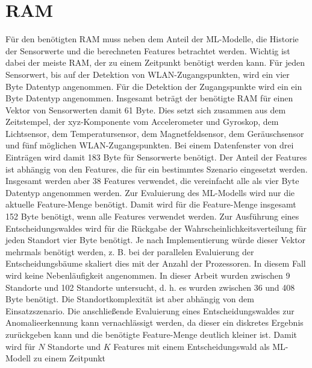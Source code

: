 \newpage
\section{RAM}
Für den benötigten RAM muss neben dem Anteil der ML-Modelle, die Historie der Sensorwerte und die berechneten Features betrachtet werden.
Wichtig ist dabei der meiste RAM, der zu einem Zeitpunkt benötigt werden kann.
\newline
\newline
Für jeden Sensorwert, bis auf der Detektion von WLAN-Zugangspunkten, wird ein vier Byte Datentyp angenommen.
Für die Detektion der Zugangspunkte wird ein ein Byte Datentyp angenommen.
Insgesamt beträgt der benötigte RAM für einen Vektor von Sensorwerten damit 61 Byte.
\newline
\newline
Dies setzt sich zusammen aus dem Zeitstempel, der xyz-Komponente vom Accelerometer und Gyroskop, dem Lichtsensor,
dem Temperatursensor, dem Magnetfeldsensor, dem Geräuschsensor und fünf möglichen WLAN-Zugangspunkten.
Bei einem Datenfenster von drei Einträgen wird damit 183 Byte für Sensorwerte benötigt.
\newline
\newline
Der Anteil der Features ist abhängig von den Features, die für ein bestimmtes Szenario eingesetzt werden.
Insgesamt werden aber 38 Features verwendet, die vereinfacht alle als vier Byte Datentyp angenommen werden.
Zur Evaluierung des ML-Modells wird nur die aktuelle Feature-Menge benötigt.
Damit wird für die Feature-Menge insgesamt 152 Byte benötigt, wenn alle Features verwendet werden.
\newline
\newline
Zur Ausführung eines Entscheidungswaldes wird für die Rückgabe der Wahrscheinlichkeitsverteilung für jeden Standort vier Byte benötigt.
Je nach Implementierung würde dieser Vektor mehrmals benötigt werden, z. B. bei der parallelen Evaluierung der Entscheidungsbäume skaliert dies mit der Anzahl der Prozessoren.
In diesem Fall wird keine Nebenläufigkeit angenommen.
In dieser Arbeit wurden zwischen 9 Standorte und 102 Standorte untersucht, d. h. es wurden zwischen 36 und 408 Byte benötigt.
Die Standortkomplexität ist aber abhängig von dem Einsatzszenario.
Die anschließende Evaluierung eines Entscheidungswaldes zur Anomalieerkennung kann vernachlässigt werden,
da dieser ein diskretes Ergebnis zurückgeben kann und die benötigte Feature-Menge deutlich kleiner ist.
Damit wird für $N$ Standorte und $K$ Features mit einem Entscheidungswald als ML-Modell zu einem Zeitpunkt
